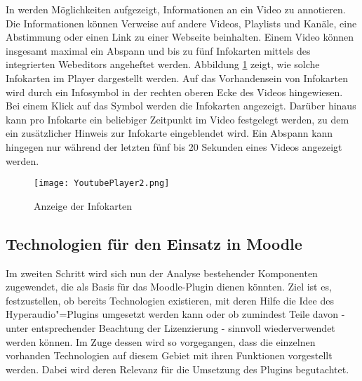 In \citep{youtubeinfokarten,youtubeabspann} werden Möglichkeiten aufgezeigt, Informationen an ein Video zu annotieren. Die Informationen können Verweise auf andere Videos, Playlists und Kanäle, eine Abstimmung oder einen Link zu einer Webseite beinhalten. Einem Video können insgesamt maximal ein Abspann und bis zu fünf Infokarten mittels des integrierten Webeditors angeheftet werden. Abbildung \ref{fig:YoutubePlayer2} zeigt, wie solche Infokarten im Player dargestellt werden. Auf das Vorhandensein von Infokarten wird durch ein Infosymbol in der rechten oberen Ecke des Videos hingewiesen. Bei einem Klick auf das Symbol werden die Infokarten angezeigt. Darüber hinaus kann pro Infokarte ein beliebiger Zeitpunkt im Video festgelegt werden, zu dem ein zusätzlicher Hinweis zur Infokarte eingeblendet wird. Ein Abspann kann hingegen nur während der letzten fünf bis 20 Sekunden eines Videos angezeigt werden.

\begin{figure}[h!]
\texttt{[image: YoutubePlayer2.png]}
\caption{\label{fig:YoutubePlayer2}Anzeige der Infokarten \citep{Youtube2015Panic}}
\end{figure}


\subsection{Technologien für den Einsatz in Moodle}
\label{sub:TechnologienMoodle}
Im zweiten Schritt wird sich nun der Analyse bestehender Komponenten zugewendet, die als Basis für das Moodle-Plugin dienen könnten. Ziel ist es, festzustellen, ob bereits Technologien existieren, mit deren Hilfe die Idee des Hyperaudio"=Plugins umgesetzt werden kann oder ob zumindest Teile davon - unter entsprechender Beachtung der Lizenzierung - sinnvoll wiederverwendet werden können. Im Zuge dessen wird so vorgegangen, dass die einzelnen vorhanden Technologien auf diesem Gebiet mit ihren Funktionen vorgestellt werden. Dabei wird deren Relevanz für die Umsetzung des Plugins begutachtet.

